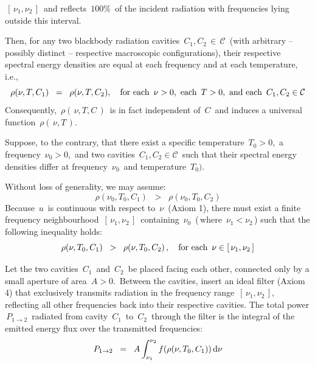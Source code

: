 \begin{theorem}
\begin{itemize}
    \,$[\,\nu_{1}, \nu_{2}\,]$\,
    and reflects \,$100\%$\, of the incident radiation
    with frequencies lying outside this interval.
\end{itemize}
Then, for any two blackbody radiation cavities
\,$C_{1}, C_{2} \,\in\, \mathcal{C}$\,
(with arbitrary -- possibly distinct -- respective macroscopic configurations),
their respective spectral energy densities are equal
at each frequency and at each temperature, i.e.,
\begin{equation*}
\rho(\nu, T, C_{1})
\;\;=\;\;
    \rho(\nu, T, C_{2}),
\quad
\textnormal{for each \,$\nu > 0$,\, each \,$T > 0$,\, and each \,$C_{1}, C_{2} \in \mathcal{C}$}
\end{equation*}
Consequently,
\,$\rho(\,\nu,T,C\,)$\,
is in fact independent of \,$C$\, and
induces a universal function \,$\rho(\,\nu,T\,)$.\,
\end{theorem}
\proof
Suppose, to the contrary, that there exist a specific temperature
\,$T_{0} > 0$,\, a frequency \,$\nu_0 > 0$,\, and two cavities
\,$C_{1}, C_{2} \in \mathcal{C}$\,
such that their spectral energy densities differ
at frequency \,$\nu_{0}$\, and temperature \,$T_{0})$.\,

\vskip 0.2cm
\noindent
Without loss of generality, we may assume:
\begin{equation*}
\rho(\nu_0, T_{0}, C_{1})
\;\; > \;\;
    \rho(\nu_0, T_{0}, C_{2})
\end{equation*}
Because \,$u$\, is continuous with respect to \,$\nu$\, (Axiom 1),
there must exist a finite frequency neighbourhood \,$[\,\nu_{1}, \nu_{2}\,]$\,
containing \,$\nu_{0}$\, (\,where \,$\nu_{1} < \nu_{2}$\,)
such that the following inequality holds:
\begin{equation*}
\rho(\nu, T_{0}, C_{1})
\;\; > \;\;
    \rho(\nu, T_{0}, C_{2})\,,
\quad
\textnormal{for each \,$\nu \in [\,\nu_{1}, \nu_{2}\,]$}
\end{equation*}

\vskip 0.2cm
\noindent
Let the two cavities
\,$C_{1}$\, and \,$C_{2}$\,
be placed facing each other,
connected only by a small aperture of area \,$A > 0$.\,
Between the cavities, insert an ideal filter (Axiom 4)
that exclusively transmits radiation in the frequency range \,$[\,\nu_{1}, \nu_{2}\,]$,\,
reflecting all other frequencies back into their respective cavities.
The total power \,$P_{1 \to 2}$\, radiated from cavity \,$C_{1}$\, to \,$C_{2}$\,
through the filter is the integral of the emitted energy flux over the transmitted frequencies:
\begin{equation*}
P_{1 \rightarrow 2}
\;\; = \;\;
    A \int_{\nu_{1}}^{\nu_{2}} f(\rho(\nu, T_{0}, C_{1})) \, \textnormal{d}\nu
\end{equation*}

